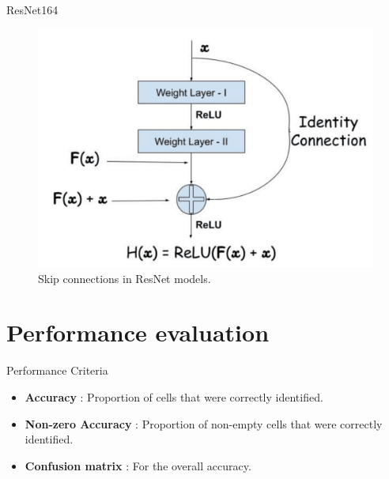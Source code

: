 \documentclass[12pt, dvipsnames]{beamer}
\begin{document}
\begin{frame}{ResNet164}
    \begin{figure}
        \centering
        \includegraphics[scale = 0.45]{resources/png/SkipConnections.PNG}
        \caption{Skip connections in ResNet models.\footnotemark}
    \end{figure}
\end{frame}

\section{Performance evaluation}

\begin{frame}{Performance Criteria}
    \begin{itemize}
        \item \textbf{Accuracy} : Proportion of cells that were correctly identified.
        \item \textbf{Non-zero Accuracy} : Proportion of non-empty cells that were correctly identified.
        \item \textbf{Confusion matrix} : For the overall accuracy.
    \end{itemize}
\end{frame}
\end{document}
